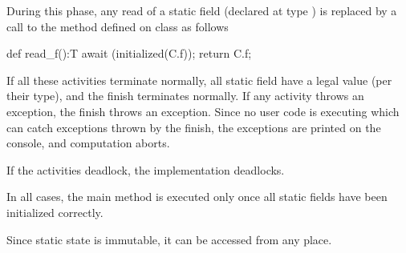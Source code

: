 During this phase, any read of a static field  (declared at type )
is replaced by a call to the method  defined on class 
as follows

\begin{xten}
def read_f():T {
   await (initialized(C.f));
   return C.f;
}
\end{xten}
 

If all these activities terminate normally, all static field have a
legal value (per their type), and the finish terminates normally. If
any activity throws an exception, the finish throws an
exception. Since no user code is executing which can catch exceptions
thrown by the finish, the exceptions are printed on the console, and
computation aborts.


If the activities deadlock, the implementation deadlocks.

In all cases, the main method is executed only once all static fields
have been initialized correctly.

Since static state is immutable, it can be accessed from any
place.


